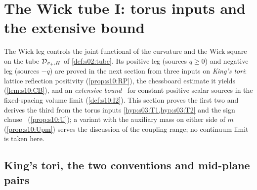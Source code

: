 \section{The Wick tube I: torus inputs and the extensive bound}

The Wick leg controls the joint functional of the curvature and the Wick square on the tube $\mathcal D_{\sigma_+,H}$ of \cref{def:s02:tube}. Its positive leg (sources $q\ge0$) and negative leg (sources $-q$) are proved in the next section from three inputs on \emph{King's tori}: lattice reflection positivity (\cref{prop:s10:RP}), the chessboard estimate it yields (\cref{lem:s10:CB}), and an \emph{extensive bound} \Itwo\ for constant positive scalar sources in the fixed-spacing volume limit (\cref{def:s10:I2}). This section proves the first two and derives the third from the torus inputs \cref{hyp:s03:T1,hyp:s03:T2} and the sign clause \Tthree\ (\cref{prop:s10:U}); a variant with the auxiliary mass on either side of $m$ (\cref{prop:s10:Upm}) serves the discussion of the coupling range; no continuum limit is taken here.

\subsection{King's tori, the two conventions and mid-plane pairs}

